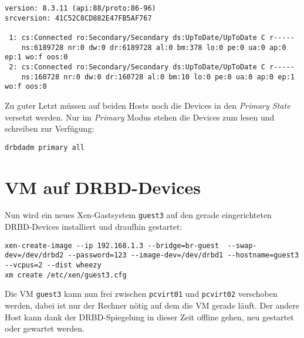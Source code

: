 \setupVerbatimOut
\begin{verbatim}
version: 8.3.11 (api:88/proto:86-96)
srcversion: 41C52C8CD882E47FB5AF767 

 1: cs:Connected ro:Secondary/Secondary ds:UpToDate/UpToDate C r-----
    ns:6189728 nr:0 dw:0 dr:6189728 al:0 bm:378 lo:0 pe:0 ua:0 ap:0 ep:1 wo:f oos:0
 2: cs:Connected ro:Secondary/Secondary ds:UpToDate/UpToDate C r-----
    ns:160728 nr:0 dw:0 dr:160728 al:0 bm:10 lo:0 pe:0 ua:0 ap:0 ep:1 wo:f oos:0
\end{verbatim}

Zu guter Letzt müssen auf beiden Hosts noch die Devices in den \emph{Primary State} versetzt werden. Nur im \emph{Primary} Modus stehen die Devices zum lesen und schreiben zur Verfügung:
\setupVerbatimOut
\begin{verbatim}
drbdadm primary all
\end{verbatim}

\section{VM auf DRBD-Devices}
Nun wird ein neues Xen-Gastsystem \verb#guest3# auf den gerade eingerichteten DRBD-Devices installiert und draufhin gestartet:
\setupVerbatimOut
\begin{verbatim}
xen-create-image --ip 192.168.1.3 --bridge=br-guest  --swap-dev=/dev/drbd2 --password=123 --image-dev=/dev/drbd1 --hostname=guest3 --vcpus=2 --dist wheezy
xm create /etc/xen/guest3.cfg
\end{verbatim}

Die VM \verb|guest3| kann nun frei zwischen \verb#pcvirt01# und \verb#pcvirt02# verschoben werden, dabei ist nur der Rechner nötig auf dem die VM gerade läuft. Der andere Host kann dank der DRBD-Spiegelung in dieser Zeit offline gehen, neu gestartet oder gewartet werden.


